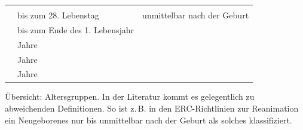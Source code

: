 


{}
{}
{}
{
\begin{tabulary}{\linewidth}{LLL}\addlinespace\toprule\addlinespace
\noindent{}&\noindent{}&\noindent{}
\\\addlinespace\midrule\addlinespace
{} & bis zum 28. Lebenstag & unmittelbar nach der Geburt
\\\addlinespace
{} & bis zum Ende des 1. Lebensjahr
\\\addlinespace
{} &  Jahre
\\\addlinespace
{} &  Jahre
\\\addlinespace
{} &  Jahre
\\\bottomrule
\end{tabulary}
}
{Übersicht: Altersgruppen. In der Literatur kommt es
gelegentlich zu abweichenden Definitionen. So ist z.\,B. in den
ERC-Richtlinien zur Reanimation ein Neugeborenes nur bis
unmittelbar nach der Geburt als solches
klassifiziert.\label{tab:altersgruppen-kinder}}
{}



